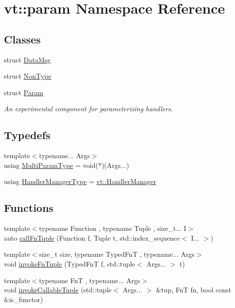 \hypertarget{namespacevt_1_1param}{}\section{vt\+:\+:param Namespace Reference}
\label{namespacevt_1_1param}
\subsection*{Classes}
\begin{DoxyCompactItemize}
\item 
struct \hyperlink{structvt_1_1param_1_1_data_msg}{Data\+Msg}
\item 
struct \hyperlink{structvt_1_1param_1_1_non_type}{Non\+Type}
\item 
struct \hyperlink{structvt_1_1param_1_1_param}{Param}
\begin{DoxyCompactList}\small\item\em An experimental component for parameterizing handlers. \end{DoxyCompactList}\end{DoxyCompactItemize}
\subsection*{Typedefs}
\begin{DoxyCompactItemize}
\item 
{\footnotesize template$<$typename... Args$>$ }\\using \hyperlink{namespacevt_1_1param_ada9e92f75ab7e859947a8ffe5bae6c5b}{Multi\+Param\+Type} = void($\ast$)(Args...)
\item 
using \hyperlink{namespacevt_1_1param_ad9561687e11201a35ed8aba0b666c0b4}{Handler\+Manager\+Type} = \hyperlink{structvt_1_1_handler_manager}{vt\+::\+Handler\+Manager}
\end{DoxyCompactItemize}
\subsection*{Functions}
\begin{DoxyCompactItemize}
\item 
{\footnotesize template$<$typename Function , typename Tuple , size\+\_\+t... I$>$ }\\auto \hyperlink{namespacevt_1_1param_abc9c93cc76336669a28b64f562dd78a3}{call\+Fn\+Tuple} (Function f, Tuple t, std\+::index\+\_\+sequence$<$ I... $>$)
\item 
{\footnotesize template$<$size\+\_\+t size, typename Typed\+FnT , typename... Args$>$ }\\void \hyperlink{namespacevt_1_1param_a8df465cc087697f52404eddfada30574}{invoke\+Fn\+Tuple} (Typed\+FnT f, std\+::tuple$<$ Args... $>$ t)
\item 
{\footnotesize template$<$typename FnT , typename... Args$>$ }\\void \hyperlink{namespacevt_1_1param_a3aec8e4301c9035e3333fe9d186171fe}{invoke\+Callable\+Tuple} (std\+::tuple$<$ Args... $>$ \&tup, FnT fn, bool const \&is\+\_\+functor)
\end{DoxyCompactItemize}


